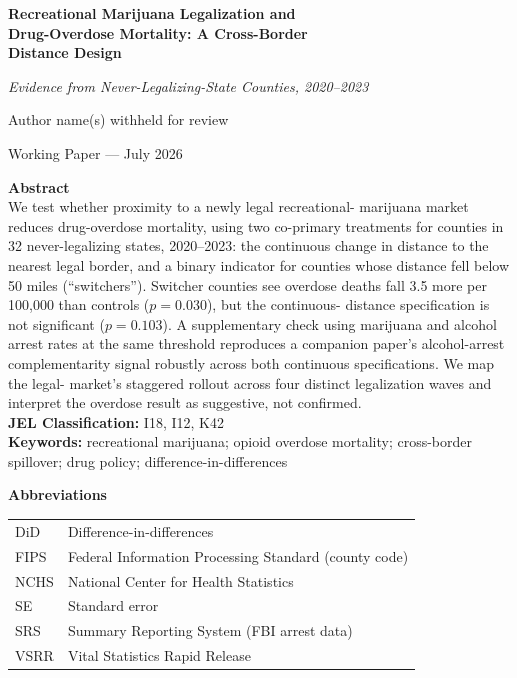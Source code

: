 \documentclass[11pt]{article}
\title{}
\author{}
\date{}
\begin{document}
\begin{titlepage}
\begin{center}
\vspace*{1.5cm}
{\LARGE \bfseries Recreational Marijuana Legalization and\\
Drug-Overdose Mortality: A Cross-Border\\
Distance Design\par}
\vspace{0.3cm}
{\large \itshape Evidence from Never-Legalizing-State Counties, 2020--2023\par}
\vspace{1.2cm}
{\large Author name(s) withheld for review\par}
\vspace{0.3cm}
{\normalsize Working Paper --- July 2026\par}
\end{center}

\vspace{1.2cm}
\noindent\textbf{Abstract} \\[4pt]
\noindent We test whether proximity to a newly legal recreational-
marijuana market reduces drug-overdose mortality, using two
co-primary treatments for counties in 32 never-legalizing states,
2020--2023: the continuous change in distance to the nearest legal
border, and a binary indicator for counties whose distance fell below
50 miles (``switchers''). Switcher counties see overdose deaths fall
3.5 more per 100,000 than controls ($p=0.030$), but the continuous-
distance specification is not significant ($p=0.103$). A supplementary
check using marijuana and alcohol arrest rates at the same threshold
reproduces a companion paper's alcohol-arrest complementarity signal
robustly across both continuous specifications. We map the legal-
market's staggered rollout across four distinct legalization waves and
interpret the overdose result as suggestive, not confirmed. \\[10pt]
\noindent\textbf{JEL Classification:} I18, I12, K42 \\
\noindent\textbf{Keywords:} recreational marijuana; opioid overdose
mortality; cross-border spillover; drug policy;
difference-in-differences

\vfill
\noindent\textbf{Abbreviations} \\[2pt]
\noindent
\begin{tabular}{@{}ll@{}}
DiD    & Difference-in-differences \\
FIPS   & Federal Information Processing Standard (county code) \\
NCHS   & National Center for Health Statistics \\
SE     & Standard error \\
SRS    & Summary Reporting System (FBI arrest data) \\
VSRR   & Vital Statistics Rapid Release \\
\end{tabular}


\end{titlepage}
\end{document}

